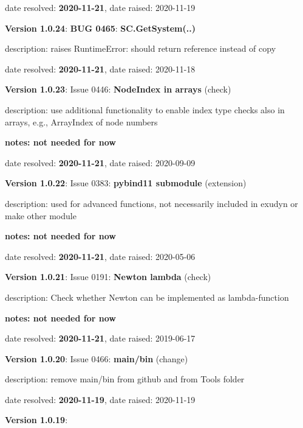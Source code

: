   \item   date resolved: {\bf 2020-11-21},
date raised: 2020-11-19   \ei
  \item {\bf Version 1.0.24}: \vspace{-6pt} 
{\bf \color{warningRed}  BUG 0465}: {\bf SC.GetSystem(..)}
  \bi
  \item {\small description: raises RuntimeError: should return reference instead of copy}
  \item   date resolved: {\bf 2020-11-21},
date raised: 2020-11-18   \ei
  \item {\bf Version 1.0.23}: \vspace{-6pt} 
  Issue 0446: {\bf NodeIndex in arrays}
(check)
  \bi
  \item {\small description: use additional functionality to enable index type checks also in arrays, e.g., ArrayIndex of node numbers}
  \item {\small \bf notes: not needed for now}
  \item   date resolved: {\bf 2020-11-21},
date raised: 2020-09-09   \ei
  \item {\bf Version 1.0.22}: \vspace{-6pt} 
  Issue 0383: {\bf pybind11 submodule}
(extension)
  \bi
  \item {\small description: used for advanced functions, not necessarily included in exudyn or make other module}
  \item {\small \bf notes: not needed for now}
  \item   date resolved: {\bf 2020-11-21},
date raised: 2020-05-06   \ei
  \item {\bf Version 1.0.21}: \vspace{-6pt} 
  Issue 0191: {\bf Newton lambda}
(check)
  \bi
  \item {\small description: Check whether Newton can be implemented as lambda-function}
  \item {\small \bf notes: not needed for now}
  \item   date resolved: {\bf 2020-11-21},
date raised: 2019-06-17   \ei
  \item {\bf Version 1.0.20}: \vspace{-6pt} 
  Issue 0466: {\bf main/bin}
(change)
  \bi
  \item {\small description: remove main/bin from github and from Tools folder}
  \item   date resolved: {\bf 2020-11-19},
date raised: 2020-11-19   \ei
  \item {\bf Version 1.0.19}: \vspace{-6pt} 
